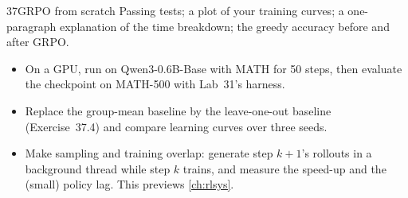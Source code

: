 \begin{labbox}{37}{GRPO from scratch}
Passing tests; a plot of your training curves; a one-paragraph explanation of the
time breakdown; the greedy accuracy before and after GRPO.

\begin{itemize}
\item On a GPU, run  on Qwen3-0.6B-Base with MATH for 50 steps, then
evaluate the checkpoint on MATH-500 with Lab~31's harness.
\item Replace the group-mean baseline by the leave-one-out baseline (Exercise~37.4) and
compare learning curves over three seeds.
\item Make sampling and training overlap: generate step $k{+}1$'s rollouts in a background
thread while step $k$ trains, and measure the speed-up and the (small) policy lag. This
previews \cref{ch:rlsys}.
\end{itemize}
\end{labbox}

